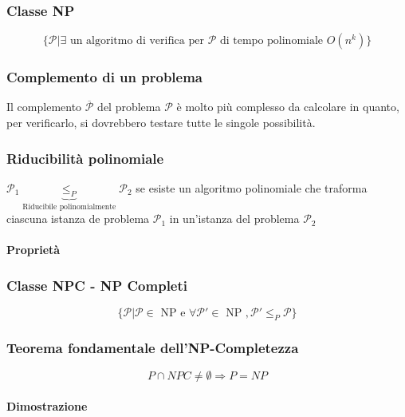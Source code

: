 
\subsubsection{Classe NP}

\begin{equation}
\{\mathcal{P} | \exists \text{ un algoritmo di verifica per } \mathcal{P} \text{ di tempo polinomiale } O(n^k) \}
\end{equation}


\subsubsection{Complemento di un problema}

Il complemento $\mathcal{\overline{P}}$ del problema $\mathcal{P}$ è molto più complesso da calcolare in quanto, per verificarlo, si dovrebbero testare tutte le singole possibilità.


\subsubsection{Riducibilità polinomiale}

$\mathcal{P}_1 \underbrace{\leq_P}_\text{Riducibile polinomialmente} \mathcal{P}_2$ se esiste un algoritmo polinomiale che traforma ciascuna istanza de problema $\mathcal{P}_1$ in un'istanza del problema $\mathcal{P}_2$

\paragraph{Proprietà}


\subsubsection{Classe NPC - NP Completi}

\begin{equation}
\{\mathcal{P} | \mathcal{P} \in \text{ NP e } \forall \mathcal{P}' \in \text{ NP }, \mathcal{P}' \leq_P \mathcal{P} \}
\end{equation}


\subsubsection{Teorema fondamentale dell'NP-Completezza}

\begin{equation}
P \cap NPC \neq \emptyset \Rightarrow P = NP
\end{equation}

\paragraph{Dimostrazione}
